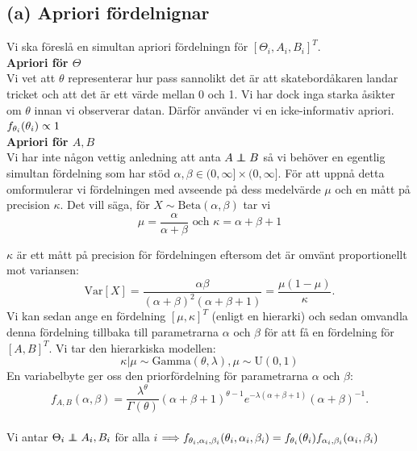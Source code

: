 \documentclass{assignment}
\begin{document}
\subsection*{(a) Apriori fördelnignar}
Vi ska föreslå en simultan apriori fördelningn för $[\Theta_i,A_i,B_i]^T$.
\\ \textbf{Apriori för $\Theta$}
\\ Vi vet att $\theta$ representerar hur pass sannolikt det är att skatebordåkaren landar tricket och att det är ett värde mellan 0 och 1. 
Vi har dock inga starka åsikter om $\theta$ innan vi observerar datan. Därför använder vi en
icke-informativ apriori.
\\ $f_{\theta_i}(\theta_i)\propto 1$
\\ \textbf{Apriori för $A,B$}
\\ Vi har inte någon vettig anledning att anta $A\perp\!\!\!\!\perp B$ så vi behöver en egentlig simultan fördelning
som har stöd $\alpha,\beta \in (0,\infty]\times (0,\infty]$.
För att uppnå detta omformulerar vi fördelningen med avseende på dess medelvärde $\mu$ och en mått på precision $\kappa$. Det vill säga, för $X\sim\mathrm{Beta}(\alpha, \beta)$ tar vi
$$\mu = \frac{\alpha}{\alpha + \beta} \text{ och } \kappa = \alpha + \beta + 1$$

$\kappa$ är ett mått på precision för fördelningen eftersom det är omvänt proportionellt mot variansen:
$$
\mathrm{Var}[X] = \frac{\alpha\beta}{(\alpha + \beta)^2(\alpha + \beta + 1)} = \frac{\mu(1 - \mu)}{\kappa}.
$$
Vi kan sedan ange en fördelning $[\mu, \kappa]^T$ (enligt en hierarki) och sedan omvandla denna
fördelning tillbaka till parametrarna $\alpha$ och $\beta$ för att få en fördelning för $[A, B]^T$.
Vi tar den hierarkiska modellen:
$$\kappa | \mu \sim \mathrm{Gamma}(\theta, \lambda),\mu \sim \mathrm{U}(0,1)$$
En variabelbyte ger oss den priorfördelning för parametrarna $\alpha$ och $\beta$:
$$f_{A, B}(\alpha, \beta) = \frac{\lambda^\theta}{\Gamma(\theta)}(\alpha + \beta + 1)^{\theta - 1}e^{-\lambda(\alpha + \beta + 1)}(\alpha + \beta)^{-1}.$$
\\Vi antar $\Theta_i \perp\!\!\!\!\perp A_i,B_i$ för alla $i$ $\Longrightarrow f_{\theta_i,\alpha_i,\beta_i}(\theta_i,\alpha_i,\beta_i) = f_{\theta_i}(\theta_i)f_{\alpha_i,\beta_i}(\alpha_i,\beta_i)$ 
\end{document}
